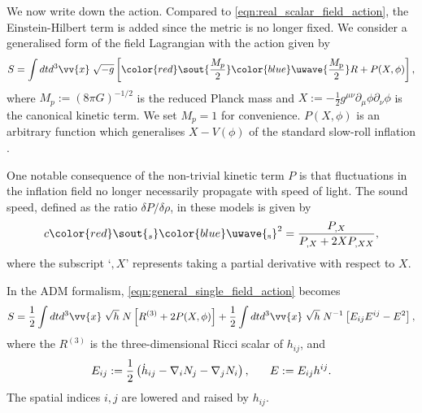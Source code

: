 \documentclass[a4paper,12pt,times,custombib,print,index]{Classes/PhDThesisPSnPDF} %
\providecommand{\DIFadd}[1]{{\protect\color{blue}\uwave{#1}}} %
\providecommand{\DIFdel}[1]{{\protect\color{red}\sout{#1}}}                      %
\providecommand{\DIFaddbegin}{} %
\providecommand{\DIFaddend}{} %
\providecommand{\DIFdelbegin}{} %
\providecommand{\DIFdelend}{} %
\newcommand{\DIFscaledelfig}{0.5}
\newlength{\DIFdelgraphicswidth} %
\newlength{\DIFdelgraphicsheight} %
\newcommand{\DIFaddincludegraphics}[2][]{{\color{blue}\fbox{\DIFOincludegraphics[#1]{#2}}}} %
\newcommand{\DIFdelincludegraphics}[2][]{%
\sbox{\DIFdelgraphicsbox}{\DIFOincludegraphics[#1]{#2}}%
\settoboxwidth{\DIFdelgraphicswidth}{\DIFdelgraphicsbox} %
\settoboxtotalheight{\DIFdelgraphicsheight}{\DIFdelgraphicsbox} %
\scalebox{\DIFscaledelfig}{%
\parbox[b]{\DIFdelgraphicswidth}{\usebox{\DIFdelgraphicsbox}\\[-\baselineskip] \rule{\DIFdelgraphicswidth}{0em}}\llap{\resizebox{\DIFdelgraphicswidth}{\DIFdelgraphicsheight}{%
\setlength{\unitlength}{\DIFdelgraphicswidth}%
\begin{picture}(1,1)%
\thicklines\linethickness{2pt} %
{\color[rgb]{1,0,0}\put(0,0){\framebox(1,1){}}}%
{\color[rgb]{1,0,0}\put(0,0){\line( 1,1){1}}}%
{\color[rgb]{1,0,0}\put(0,1){\line(1,-1){1}}}%
\end{picture}%
}\hspace*{3pt}}} %
} %
\DeclareRobustCommand{\DIFaddbegin}{\DIFOaddbegin \let\includegraphics\DIFaddincludegraphics} %
\DeclareRobustCommand{\DIFaddend}{\DIFOaddend \let\includegraphics\DIFOincludegraphics} %
\DeclareRobustCommand{\DIFdelbegin}{\DIFOdelbegin \let\includegraphics\DIFdelincludegraphics} %
\DeclareRobustCommand{\DIFdelend}{\DIFOaddend \let\includegraphics\DIFOincludegraphics} %
\begin{document}
We now write down the action. Compared to \eqref{eqn:real_scalar_field_action}, the Einstein-Hilbert term is added since the metric is no longer fixed. We consider a generalised form of the field Lagrangian with the action given by
\begin{align}
	S = \int dt d^3 \vv{x} \; \sqrt{-g} \left[ \DIFdelbegin \DIFdel{\frac{M_p}{2} }\DIFdelend \DIFaddbegin \DIFadd{\frac{M_\textrm{p}}{2} }\DIFaddend R + P(X,\phi) \right],  \label{eqn:general_single_field_action}
\end{align}
where \DIFdelbegin \DIFdel{$M_p := (8\pi G)^{-1/2}$ }\DIFdelend \DIFaddbegin \DIFadd{$M_\textrm{p} := (8\pi G)^{-1/2}$ }\DIFaddend is the reduced Planck mass and $X:=-\frac{1}{2} g^{\mu\nu} \partial_\mu \phi \partial_\nu \phi$ is the canonical kinetic term. We set \DIFdelbegin \DIFdel{$M_p=1$ }\DIFdelend \DIFaddbegin \DIFadd{$M_\textrm{p}=1$ }\DIFaddend for convenience. $P(X,\phi)$ is an arbitrary function which generalises $X-V(\phi)$ of the standard slow-roll inflation \cite{Chen2007b}.

One notable consequence of the non-trivial kinetic term $P$ is that \DIFaddbegin \DIFadd{the }\DIFaddend fluctuations in the inflation field no longer necessarily propagate with \DIFaddbegin \DIFadd{the }\DIFaddend speed of light. The sound speed, defined as the ratio $\delta P / \delta \rho$, in these models is given by
\begin{align}
	c\DIFdelbegin \DIFdel{_s}\DIFdelend \DIFaddbegin \DIFadd{_\text{s}}\DIFaddend ^2 = \frac{P_{,X}}{P_{,X} + 2 X P_{,XX}}, \label{eqn:general_single_field_sound_speed}
\end{align}
where the subscript `$,X$' represents taking a partial derivative with respect to $X$.

In the ADM formalism, \eqref{eqn:general_single_field_action} becomes
\begin{align}
	S = \frac{1}{2}\int dt d^3 \vv{x} \; \sqrt{h} \; N \left[ R^{(3)} + 2P(X,\phi) \right] + \frac{1}{2} \int dt d^3 \vv{x} \; \sqrt{h} \; N^{-1} \left[ E_{ij} E^{ij} - E^2 \right],
\end{align}
where the $R^{(3)}$ is the three-dimensional Ricci scalar of $h_{ij}$, and
\begin{align}
	E_{ij} := \frac{1}{2} \left( \dot{h}_{ij} - \nabla_i N_j - \nabla_j N_i \right), \hspace{0.05\textwidth}
	E := E_{ij} h^{ij}.
\end{align}
The spatial indices $i,j$ are lowered and raised by $h_{ij}$.
\end{document}
